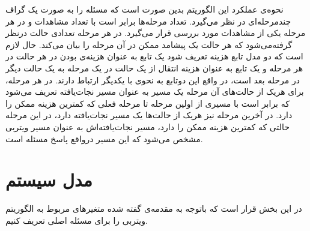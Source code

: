 	 نحوه‌ی عملکرد این الگوریتم بدین صورت است که مسئله را به صورت یک گراف چندمرحله‌ای در نظر می‌گیرد. تعداد مرحله‌ها برابر است با تعداد مشاهدات و در هر مرحله یکی از مشاهدات مورد بررسی قرار می‌گیرد. در هر مرحله تعدادی حالت درنظر گرفته‌می‌شود که هر حالت یک پیشامد ممکن در آن مرحله را بیان می‌کند. حال لازم است که دو مدل تابع هزینه تعریف شود یک تابع به عنوان هزینه‌ی بودن در هر حالت در هر مرحله و یک تابع به عنوان هزینه انتقال از یک حالت در یک مرحله به یک حالت دیگر در مرحله بعد است، در واقع این دوتابع به نحوی با یکدیگر ارتباط دارند. در هر مرحله، برای هریک از حالت‌های آن مرحله یک مسیر به عنوان مسیر نجات‌یافته تعریف می‌شود که برابر است با مسیری از اولین مرحله تا مرحله فعلی که کمترین هزینه ممکن را دارد. در آخرین مرحله نیز هریک از حالت‌ها یک مسیر نجات‌یافته دارد، در این مرحله حالتی که کمترین هزینه ممکن را دارد، مسیر نجات‌یافته‌اش به عنوان مسیر ویتربی مشخص می‌شود که این مسیر درواقع پاسخ مسئله است. 
\section{مدل سیستم}	 
	در این بخش قرار است که باتوجه به مقدمه‌ی گفته شده متغیرهای مربوط به الگوریتم ویتربی را برای مسئله اصلی تعریف کنیم. 
	
